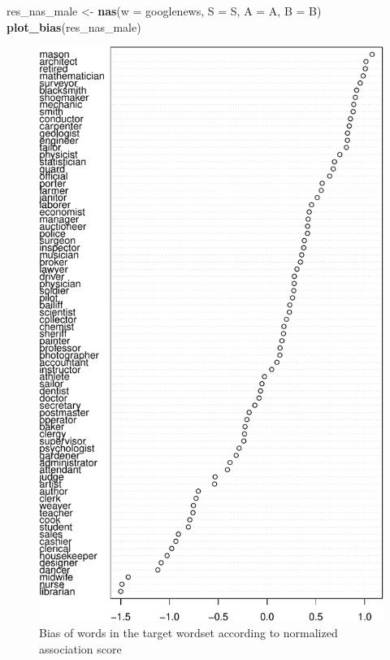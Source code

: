 \documentclass[english,man,mask]{apa6}
\newenvironment{Shaded}{\begin{snugshade}}{\end{snugshade}}
\newcommand{\DataTypeTok}[1]{\textcolor[rgb]{0.13,0.29,0.53}{#1}}
\newcommand{\KeywordTok}[1]{\textcolor[rgb]{0.13,0.29,0.53}{\textbf{#1}}}
\newcommand{\NormalTok}[1]{#1}
\newcommand{\StringTok}[1]{\textcolor[rgb]{0.31,0.60,0.02}{#1}}
\begin{document}
\begin{Shaded}
\begin{Highlighting}[]
\NormalTok{res_nas_male <-}\StringTok{ }\KeywordTok{nas}\NormalTok{(}\DataTypeTok{w =}\NormalTok{ googlenews, }\DataTypeTok{S =}\NormalTok{ S, }\DataTypeTok{A =}\NormalTok{ A, }\DataTypeTok{B =}\NormalTok{ B)}
\KeywordTok{plot_bias}\NormalTok{(res_nas_male)}
\end{Highlighting}
\end{Shaded}

\begin{figure}
\centering
\includegraphics{ica_files/figure-latex/nas-1.pdf}
\caption{\label{fig:nas}Bias of words in the target wordset according to normalized association score}
\end{figure}
\end{document}
